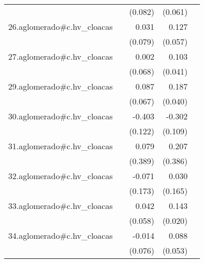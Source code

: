 {\begin{longtable}{l*{4}{D{.}{.}{-1}}}
            &                     &     (0.082)         &     (0.061)         &                     \\
\addlinespace
26.aglomerado#c.hv\_cloacas&                     &       0.031         &       0.127\sym{*}  &                     \\
            &                     &     (0.079)         &     (0.057)         &                     \\
\addlinespace
27.aglomerado#c.hv\_cloacas&                     &       0.002         &       0.103\sym{*}  &                     \\
            &                     &     (0.068)         &     (0.041)         &                     \\
\addlinespace
29.aglomerado#c.hv\_cloacas&                     &       0.087         &       0.187\sym{***}&                     \\
            &                     &     (0.067)         &     (0.040)         &                     \\
\addlinespace
30.aglomerado#c.hv\_cloacas&                     &      -0.403\sym{***}&      -0.302\sym{**} &                     \\
            &                     &     (0.122)         &     (0.109)         &                     \\
\addlinespace
31.aglomerado#c.hv\_cloacas&                     &       0.079         &       0.207         &                     \\
            &                     &     (0.389)         &     (0.386)         &                     \\
\addlinespace
32.aglomerado#c.hv\_cloacas&                     &      -0.071         &       0.030         &                     \\
            &                     &     (0.173)         &     (0.165)         &                     \\
\addlinespace
33.aglomerado#c.hv\_cloacas&                     &       0.042         &       0.143\sym{***}&                     \\
            &                     &     (0.058)         &     (0.020)         &                     \\
\addlinespace
34.aglomerado#c.hv\_cloacas&                     &      -0.014         &       0.088         &                     \\
            &                     &     (0.076)         &     (0.053)         &                     \\

\end{longtable}}
